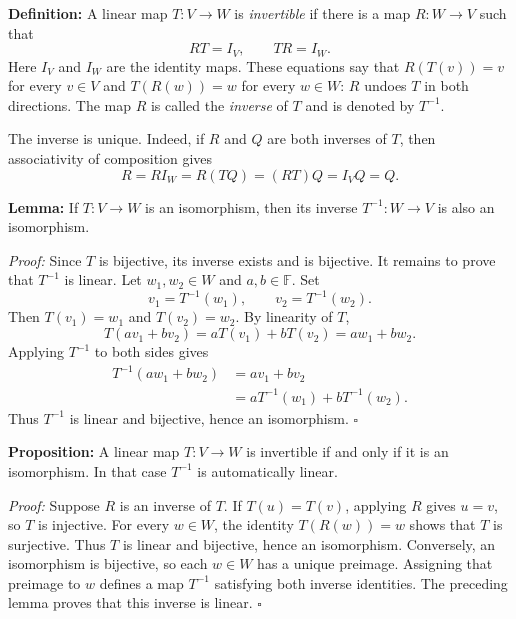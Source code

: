 \documentclass[a4paper,11pt,abstract=true]{scrartcl}
\theoremstyle{dotlessP}
\theoremstyle{dotlessS}
\theoremstyle{remark}
\theoremstyle{definition}
\begin{document}
\begin{definition_box}
\textbf{Definition:} A linear map
$T:V\longrightarrow W$ is \emph{invertible} if there is a map
$R:W\longrightarrow V$ such that
\[
RT=I_V,\qquad TR=I_W.
\]
Here $I_V$ and $I_W$ are the identity maps. These equations say that
$R(T(v))=v$ for every $v\in V$ and $T(R(w))=w$ for every $w\in W$:
$R$ undoes $T$ in both directions. The map $R$ is called the
\emph{inverse} of $T$ and is denoted by $T^{-1}$.
\end{definition_box}

\begin{claim_box}
The inverse is unique. Indeed, if $R$ and $Q$ are both inverses of $T$,
then associativity of composition gives
\[
R=R I_W=R(TQ)=(RT)Q=I_V Q=Q.
\]
\end{claim_box}

\begin{problem_box}
\textbf{Lemma:} If
$T:V\longrightarrow W$ is an isomorphism, then its inverse
$T^{-1}:W\longrightarrow V$ is also an isomorphism.

\end{problem_box}

\begin{claim_box}
\textit{Proof:} Since $T$ is bijective, its inverse exists and is bijective.
It remains to prove that $T^{-1}$ is linear. Let $w_1,w_2\in W$ and
$a,b\in\mathbb{F}$. Set
\[
v_1=T^{-1}(w_1),\qquad v_2=T^{-1}(w_2).
\]
Then $T(v_1)=w_1$ and $T(v_2)=w_2$. By linearity of $T$,
\[
T(av_1+bv_2)=aT(v_1)+bT(v_2)=aw_1+bw_2.
\]
Applying $T^{-1}$ to both sides gives
\[
\begin{aligned}
T^{-1}(aw_1+bw_2)
&=av_1+bv_2\\
&=aT^{-1}(w_1)+bT^{-1}(w_2).
\end{aligned}
\]
Thus $T^{-1}$ is linear and bijective, hence an isomorphism.
\hfill$\square$
\end{claim_box}

\begin{problem_box}
\textbf{Proposition:} A linear
map $T:V\longrightarrow W$ is invertible if and only if it is an
isomorphism. In that case $T^{-1}$ is automatically linear.

\end{problem_box}

\begin{claim_box}
\textit{Proof:} Suppose $R$ is an inverse of $T$. If $T(u)=T(v)$,
applying $R$ gives $u=v$, so $T$ is injective. For every $w\in W$,
the identity $T(R(w))=w$ shows that $T$ is surjective. Thus $T$ is
linear and bijective, hence an isomorphism.
Conversely, an isomorphism is bijective, so each $w\in W$ has a unique
preimage. Assigning that preimage to $w$ defines a map $T^{-1}$
satisfying both inverse identities. The preceding lemma proves that
this inverse is linear. \hfill$\square$
\end{claim_box}
\end{document}

